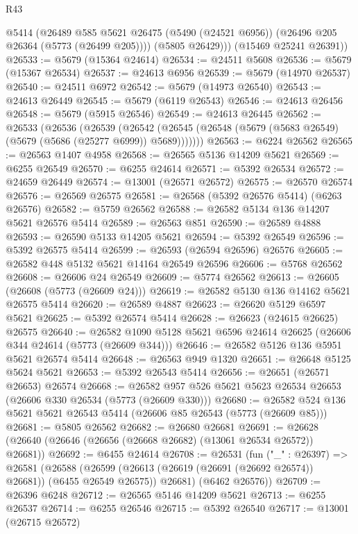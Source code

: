 \begin{lexlean}{R43}
\begin{coremodule}
          @5414
          (@26489
            @585
            @5621
            @26475
            (@5490 (@24521 @6956))
            (@26496 @205 @26364 (@5773 (@26499 @205))))
          (@5805 @26429)))
      (@15469 @25241 @26391))
@26533 := @5679 (@15364 @24614)
@26534 := @24511 @5608
@26536 := @5679 (@15367 @26534)
@26537 := @24613 @6956
@26539 := @5679 (@14970 @26537)
@26540 := @24511 @6972
@26542 := @5679 (@14973 @26540)
@26543 := @24613 @26449
@26545 := @5679 (@6119 @26543)
@26546 := @24613 @26456
@26548 := @5679 (@5915 @26546)
@26549 := @24613 @26445
@26562 := @26533
    (@26536
      (@26539
        (@26542 (@26545 (@26548 (@5679 (@5683 @26549) (@5679 (@5686 (@25277 @6999)) @5689)))))))
@26563 := @6224 @26562
@26565 := @26563 @1407 @4958
@26568 := @26565 @5136 @14209 @5621
@26569 := @6255 @26549
@26570 := @6255 @24614
@26571 := @5392 @26534
@26572 := @24659 @26449
@26574 := @13001 (@26571 @26572)
@26575 := @26570 @26574
@26576 := @26569 @26575
@26581 := @26568 (@5392 @26576 @5414) (@6263 @26576)
@26582 := @5759 @26562
@26588 := @26582 @5134 @136 @14207 @5621 @26576 @5414
@26589 := @26563 @851
@26590 := @26589 @4888
@26593 := @26590 @5133 @14205 @5621
@26594 := @5392 @26549
@26596 := @5392 @26575 @5414
@26599 := @26593 (@26594 @26596) @26576
@26605 := @26582 @448 @5132 @5621 @14164 @26549 @26596
@26606 := @5768 @26562
@26608 := @26606 @24 @26549
@26609 := @5774 @26562
@26613 := @26605 (@26608 (@5773 (@26609 @24)))
@26619 := @26582 @5130 @136 @14162 @5621 @26575 @5414
@26620 := @26589 @4887
@26623 := @26620 @5129 @6597 @5621
@26625 := @5392 @26574 @5414
@26628 := @26623 (@24615 @26625) @26575
@26640 := @26582 @1090 @5128 @5621 @6596 @24614 @26625 (@26606 @344 @24614 (@5773 (@26609 @344)))
@26646 := @26582 @5126 @136 @5951 @5621 @26574 @5414
@26648 := @26563 @949 @1320
@26651 := @26648 @5125 @5624 @5621
@26653 := @5392 @26543 @5414
@26656 := @26651 (@26571 @26653) @26574
@26668 := @26582 @957 @526 @5621 @5623 @26534 @26653 (@26606 @330 @26534 (@5773 (@26609 @330)))
@26680 := @26582 @524 @136 @5621 @5621 @26543 @5414 (@26606 @85 @26543 (@5773 (@26609 @85)))
@26681 := @5805 @26562
@26682 := @26680 @26681
@26691 := @26628 (@26640 (@26646 (@26656 (@26668 @26682) (@13061 @26534 @26572)) @26681))
@26692 := @6455 @24614
@26708 := @26531
    (fun ("_" : @26397) =>
    @26581
      (@26588
        (@26599 (@26613 (@26619 (@26691 (@26692 @26574)) @26681)) (@6455 @26549 @26575))
        @26681)
      (@6462 @26576))
@26709 := @26396 @6248
@26712 := @26565 @5146 @14209 @5621
@26713 := @6255 @26537
@26714 := @6255 @26546
@26715 := @5392 @26540
@26717 := @13001 (@26715 @26572)

\end{coremodule}
\end{lexlean}
